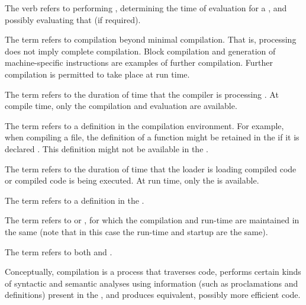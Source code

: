 The verb  refers to performing ,
determining the time of evaluation for a ,
and possibly evaluating that  (if required).

The term  refers to
 compilation beyond minimal compilation.
That is, processing does not imply complete compilation.
Block compilation and generation of machine-specific instructions are 
examples of further compilation.
Further compilation is permitted to take place at run time.

The term  refers to the duration of time that
the compiler is processing . At compile time, only the
compilation and evaluation  are available.

The term  refers to a definition in
the compilation environment.  For example, when compiling a file, the
definition of a function might be retained in the  
if it is declared . This definition might not
be available in the .

The term  refers to the duration of time that the
loader is loading compiled code or compiled code is being executed.
At run time, only the  is available.

The term  refers to a definition in the
.

The term  refers to 
or , for which the compilation and run-time 
 are maintained in the same  (note that in this
case the run-time and startup  are the same).

The term  refers to both  and
.

\endsubSection%
 
 
Conceptually, compilation is a process that traverses code, performs
certain kinds of syntactic and semantic analyses using information
(such as proclamations and  definitions) present in the
, and produces equivalent, possibly
more efficient code.


